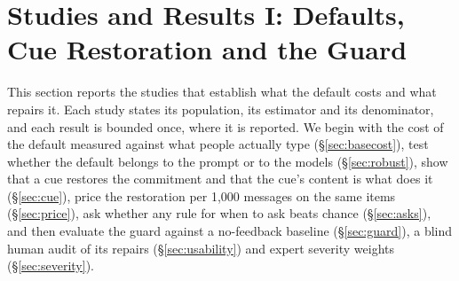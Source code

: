 
\section{Studies and Results I: Defaults, Cue Restoration and the Guard}\label{sec:default}

This section reports the studies that establish what the default costs and what repairs it. Each study states its population, its estimator and its denominator, and each result is bounded once, where it is reported. We begin with the cost of the default measured against what people actually type (\S\ref{sec:basecost}), test whether the default belongs to the prompt or to the models (\S\ref{sec:robust}), show that a cue restores the commitment and that the cue's content is what does it (\S\ref{sec:cue}), price the restoration per 1,000 messages on the same items (\S\ref{sec:price}), ask whether any rule for when to ask beats chance (\S\ref{sec:asks}), and then evaluate the guard against a no-feedback baseline (\S\ref{sec:guard}), a blind human audit of its repairs (\S\ref{sec:usability}) and expert severity weights (\S\ref{sec:severity}).

